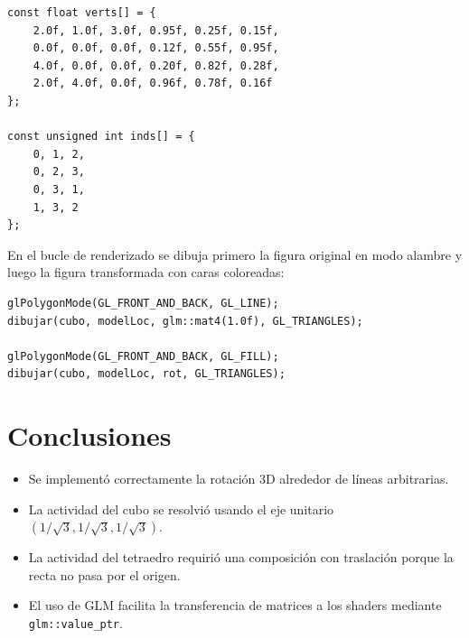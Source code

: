 \documentclass[12pt,a4paper]{article}
\begin{document}
\begin{lstlisting}[style=cxx,caption={Vertices e indices del tetraedro.}]
const float verts[] = {
    2.0f, 1.0f, 3.0f, 0.95f, 0.25f, 0.15f,
    0.0f, 0.0f, 0.0f, 0.12f, 0.55f, 0.95f,
    4.0f, 0.0f, 0.0f, 0.20f, 0.82f, 0.28f,
    2.0f, 4.0f, 0.0f, 0.96f, 0.78f, 0.16f
};

const unsigned int inds[] = {
    0, 1, 2,
    0, 2, 3,
    0, 3, 1,
    1, 3, 2
};
\end{lstlisting}

En el bucle de renderizado se dibuja primero la figura original en modo alambre y luego la figura transformada con caras coloreadas:

\begin{lstlisting}[style=cxx,caption={Dibujo del objeto original y transformado.}]
glPolygonMode(GL_FRONT_AND_BACK, GL_LINE);
dibujar(cubo, modelLoc, glm::mat4(1.0f), GL_TRIANGLES);

glPolygonMode(GL_FRONT_AND_BACK, GL_FILL);
dibujar(cubo, modelLoc, rot, GL_TRIANGLES);
\end{lstlisting}

\section*{Conclusiones}
\begin{itemize}
	\item Se implement\'o correctamente la rotaci\'on 3D alrededor de l\'ineas arbitrarias.
	\item La actividad del cubo se resolvi\'o usando el eje unitario $(1/\sqrt{3},1/\sqrt{3},1/\sqrt{3})$.
	\item La actividad del tetraedro requiri\'o una composici\'on con traslaci\'on porque la recta no pasa por el origen.
	\item El uso de GLM facilita la transferencia de matrices a los shaders mediante \texttt{glm::value\_ptr}.
\end{itemize}
\end{document}
